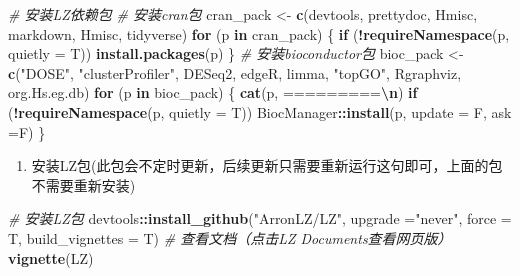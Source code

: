\documentclass[
]{book}
\newenvironment{Shaded}{\begin{snugshade}}{\end{snugshade}}
\newcommand{\AttributeTok}[1]{\textcolor[rgb]{0.13,0.29,0.53}{#1}}
\newcommand{\CommentTok}[1]{\textcolor[rgb]{0.56,0.35,0.01}{\textit{#1}}}
\newcommand{\ControlFlowTok}[1]{\textcolor[rgb]{0.13,0.29,0.53}{\textbf{#1}}}
\newcommand{\FunctionTok}[1]{\textcolor[rgb]{0.13,0.29,0.53}{\textbf{#1}}}
\newcommand{\NormalTok}[1]{#1}
\newcommand{\OtherTok}[1]{\textcolor[rgb]{0.56,0.35,0.01}{#1}}
\newcommand{\SpecialCharTok}[1]{\textcolor[rgb]{0.81,0.36,0.00}{\textbf{#1}}}
\newcommand{\StringTok}[1]{\textcolor[rgb]{0.31,0.60,0.02}{#1}}
\providecommand{\tightlist}{%
  \setlength{\itemsep}{0pt}\setlength{\parskip}{0pt}}
\begin{document}
\begin{Shaded}
\begin{Highlighting}[]
\CommentTok{\# 安装LZ依赖包}
\CommentTok{\# 安装cran包}
\NormalTok{cran\_pack }\OtherTok{\textless{}{-}} \FunctionTok{c}\NormalTok{(}\StringTok{\textquotesingle{}devtools\textquotesingle{}}\NormalTok{, }\StringTok{\textquotesingle{}prettydoc\textquotesingle{}}\NormalTok{, }\StringTok{\textquotesingle{}Hmisc\textquotesingle{}}\NormalTok{, }\StringTok{\textquotesingle{}markdown\textquotesingle{}}\NormalTok{, }
               \StringTok{\textquotesingle{}Hmisc\textquotesingle{}}\NormalTok{, }\StringTok{\textquotesingle{}tidyverse\textquotesingle{}}\NormalTok{)}
\ControlFlowTok{for}\NormalTok{ (p }\ControlFlowTok{in}\NormalTok{ cran\_pack) \{ }
  \ControlFlowTok{if}\NormalTok{ (}\SpecialCharTok{!}\FunctionTok{requireNamespace}\NormalTok{(p, }\AttributeTok{quietly =}\NormalTok{ T)) }\FunctionTok{install.packages}\NormalTok{(p) }
\NormalTok{\}}
\CommentTok{\# 安装bioconductor包}
\NormalTok{bioc\_pack }\OtherTok{\textless{}{-}} \FunctionTok{c}\NormalTok{(}\StringTok{"DOSE"}\NormalTok{, }\StringTok{"clusterProfiler"}\NormalTok{, }\StringTok{\textquotesingle{}DESeq2\textquotesingle{}}\NormalTok{, }\StringTok{\textquotesingle{}edgeR\textquotesingle{}}\NormalTok{, }
               \StringTok{\textquotesingle{}limma\textquotesingle{}}\NormalTok{, }\StringTok{"topGO"}\NormalTok{, }\StringTok{\textquotesingle{}Rgraphviz\textquotesingle{}}\NormalTok{, }\StringTok{\textquotesingle{}org.Hs.eg.db\textquotesingle{}}\NormalTok{)}
\ControlFlowTok{for}\NormalTok{ (p }\ControlFlowTok{in}\NormalTok{ bioc\_pack) \{ }
  \FunctionTok{cat}\NormalTok{(p, }\StringTok{\textquotesingle{}=========}\SpecialCharTok{\textbackslash{}n}\StringTok{\textquotesingle{}}\NormalTok{) }
  \ControlFlowTok{if}\NormalTok{ (}\SpecialCharTok{!}\FunctionTok{requireNamespace}\NormalTok{(p, }\AttributeTok{quietly =}\NormalTok{ T)) }
\NormalTok{    BiocManager}\SpecialCharTok{::}\FunctionTok{install}\NormalTok{(p, }\AttributeTok{update =}\NormalTok{ F, }\AttributeTok{ask =}\NormalTok{F) }
\NormalTok{\}}
\end{Highlighting}
\end{Shaded}

\begin{enumerate}
\def\labelenumi{\arabic{enumi}.}
\setcounter{enumi}{1}
\tightlist
\item
  安装LZ包(此包会不定时更新，后续更新只需要重新运行这句即可，上面的包不需要重新安装)
\end{enumerate}

\begin{Shaded}
\begin{Highlighting}[]
\CommentTok{\# 安装LZ包}
\NormalTok{devtools}\SpecialCharTok{::}\FunctionTok{install\_github}\NormalTok{(}\StringTok{"ArronLZ/LZ"}\NormalTok{, }\AttributeTok{upgrade =}\StringTok{"never"}\NormalTok{, }\AttributeTok{force =}\NormalTok{ T, }
                         \AttributeTok{build\_vignettes =}\NormalTok{ T)}
\CommentTok{\# 查看文档（点击LZ Documents查看网页版）}
\FunctionTok{vignette}\NormalTok{(}\StringTok{\textquotesingle{}LZ\textquotesingle{}}\NormalTok{)}
\end{Highlighting}
\end{Shaded}
\end{document}
